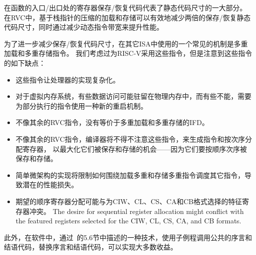 \begin{commentary}
在函数的入口/出口处的寄存器保存/恢复代码代表了静态代码尺寸的一大部分。
在RVC中，基于栈指针的压缩的加载和存储可以有效地减少两倍的保存/恢复静态代码尺寸，同时通过减少动态指令带宽来提升性能。

为了进一步减少保存/恢复代码尺寸，在其它ISA中使用的一个常见的机制是多重加载和多重存储指令。
我们考虑过为RISC-V采用这些指令，但是注意到这些指令的如下缺点：
\begin{itemize}
\item 这些指令让处理器的实现复杂化。 %
\item 对于虚拟内存系统，有些数据访问可能驻留在物理内存中，而有些不能，需要为部分执行的指令使用一种新的重启机制。 
\item 不像其余的RVC指令，没有等价于多重加载和多重存储的IFD。 
\item 不像其余的RVC指令，编译器将不得不注意这些指令，来生成指令和按次序分配寄存器，
      以最大化它们被保存和存储的机会——因为它们要按顺序次序被保存和存储。
\item 简单微架构的实现将限制如何围绕加载多重和存储多重指令调度其它指令，导致潜在的性能损失。
\item 期望的顺序寄存器分配可能与为CIW、CL、CS、CA和CB格式选择的特征寄存器冲突。
      The desire for sequential register allocation might conflict with
      the featured registers selected for the CIW, CL, CS, CA, and CB formats.
\end{itemize}
此外，在软件中，通过~\cite{waterman-phd}的5.6节中描述的一种技术，使用子例程调用公共的序言和结语代码，替换序言和结语代码，可以实现大多数收益。


\end{commentary}
